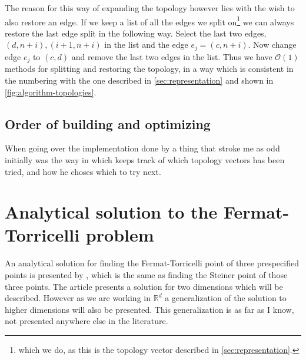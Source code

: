 The reason for this way of expanding the topology however lies with the wish to
also restore an edge. If we keep a list of all the edges we split
on\footnote{which we do, as this is the topology vector described in
  \cref{sec:representation}.} we can always restore the last edge split in the
following way. Select the last two edges, $(d, n+i), (i+1, n+i)$ in the list and
the edge $e_j = (c, n+i)$. Now change edge $e_j$ to $(c, d)$ and remove the last
two edges in the list. Thus we have $\mathcal{O}(1)$ methods for splitting and
restoring the topology, in a way which is consistent in the numbering with the
one described in \cref{sec:representation} and shown in
\cref{fig:algorithm-topologies}.

\subsection{Order of building and optimizing}
\label{sec:order-build-optim}

When going over the implementation done by \citeauthor{smith1992} a thing that
stroke me as odd initially was the way in which \citeauthor{smith1992} keeps
track of which topology vectors has been tried, and how he choses which to try
next.



\section{Analytical solution to the Fermat-Torricelli problem}
\label{sec:analyt-solut-ferm}


An analytical solution for finding the Fermat-Torricelli point of three
prespecified points is presented by \textcite{uteshev2014}, which is the same as
finding the Steiner point of those three points. The article presents a
solution for two dimensions which will be described. However as we are working
in $\mathbb{R}^d$ a generalization of the solution to higher dimensions will
also be presented. This generalization is as far as I know, not presented
anywhere else in the literature.

